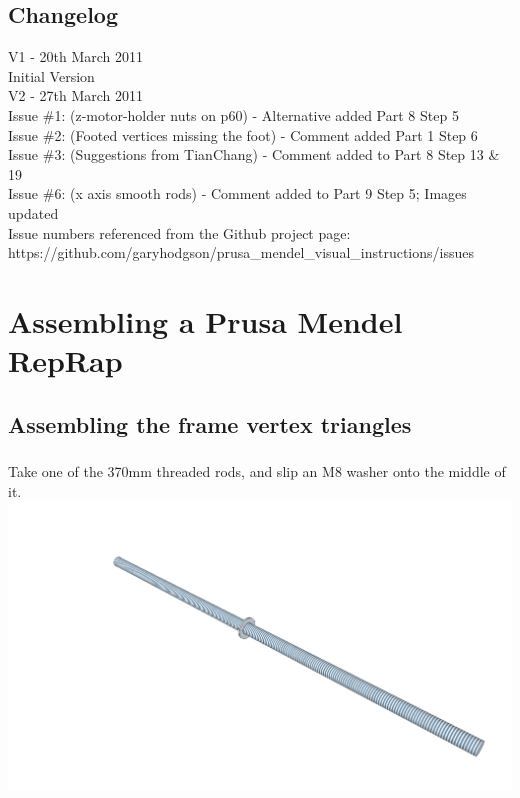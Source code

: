 \documentclass[twoside,a4paper,titlepage]{memoir}
\begin{document}
	\chapter*{Changelog}
	V1 - 20th March 2011\\
	Initial Version\\
	V2 - 27th March 2011\\
	Issue \#1: (z-motor-holder nuts on p60) - Alternative added Part 8 Step 5\\
	Issue \#2: (Footed vertices missing the foot) - Comment added Part 1 Step 6\\
	Issue \#3: (Suggestions from TianChang) - Comment added to Part 8 Step 13 \& 19\\
	Issue \#6: (x axis smooth rods) - Comment added to Part 9 Step 5; Images
	updated\\
	Issue numbers referenced from the Github project page:\\
	https://github.com/garyhodgson/prusa\_mendel\_visual\_instructions/issues\\
	
	\newpage
	
	\tableofcontents
	
	\part{Assembling a Prusa Mendel RepRap}
	
	\pagestyle{headings}
	\headsep=20pt
	
	\chapter{Assembling the frame vertex triangles}
	\section{}
	Take one of the 370mm threaded rods, and slip an M8 washer onto the middle of
	it. \\
	\includegraphics[width=1\linewidth]{graphics/ch1_1.png}
	
\end{document}
